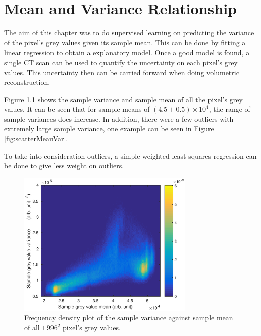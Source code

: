 \documentclass[12pt]{report}
\begin{document}

\chapter{Mean and Variance Relationship}

The aim of this chapter was to do supervised learning on predicting the variance of the pixel's grey values given its sample mean. This can be done by fitting a linear regression to obtain a explanatory model. Once a good model is found, a single CT scan can be used to quantify the uncertainty on each pixel's grey values. This uncertainty then can be carried forward when doing volumetric reconstruction.

Figure \ref{fig:histogramHeatmap} shows the sample variance and sample mean of all the pixel's grey values. It can be seen that for sample means of $(4.5\pm0.5)\times 10^4$, the range of sample variances does increase. In addition, there were a few outliers with extremely large sample variance, one example can be seen in Figure \ref{fig:scatterMeanVar}.

To take into consideration outliers, a simple weighted least squares regression can be done to give less weight on outliers.

\begin{figure}
	\centering
	\includegraphics[width=0.75\textwidth]{figures/meanVar/histogramHeatmap.eps}
	\caption{Frequency density plot of the sample variance against sample mean of all $1\,996^2$ pixel's grey values.}
	\label{fig:histogramHeatmap}
\end{figure}
\end{document}
